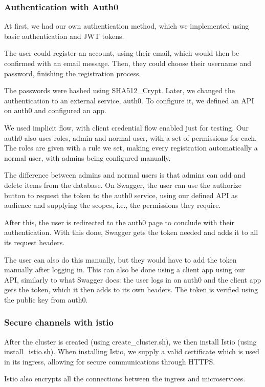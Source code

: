 \documentclass[oneside]{article}
\newcommand*\fpar{\hspace{1ex}}
\begin{document}
    \subsubsection{Authentication with Auth0}
    \fpar At first, we had our own authentication method, which we implemented using basic authentication and JWT tokens. 
    \par The user could register an account, using their email, which would then be confirmed with an email message. Then, they could choose their username and password, finishing the registration process. 
    \par The passwords were hashed using SHA512\_Crypt. Later, we changed the authentication to an external service, auth0. To configure it, we defined an API on auth0 and configured an app. 
    \par We used implicit flow, with client credential flow enabled just for testing. Our auth0 also uses roles, admin and normal user, with a set of permissions for each. The roles are given with a rule we set, making every registration automatically a normal user, with admins being configured manually. 
    \par The difference between admins and normal users is that admins can add and delete items from the database. On Swagger, the user can use the authorize button to request the token to the auth0 service, using our defined API as audience and supplying the scopes, i.e., the permissions they require. 
    \par After this, the user is redirected to the auth0 page to conclude with their authentication. With this done, Swagger gets the token needed and adds it to all its request headers. 
    \par The user can also do this manually, but they would have to add the token manually after logging in. This can also be done using a client app using our API, similarly to what Swagger does: the user logs in on auth0 and the client app gets the token, which it then adds to its own headers. The token is verified using the public key from auth0.

    \subsubsection{Secure channels with istio}
    \fpar After the cluster is created (using create\_cluster.sh), we then install Istio (using install\_istio.sh). When installing Istio, we supply a valid certificate which is used in its ingress, allowing for secure communications through HTTPS. 
    \par Istio also encrypts all the connections between the ingress and microservices.
\end{document}
